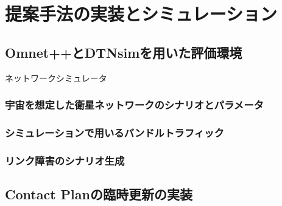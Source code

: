 \chapter{提案手法の実装とシミュレーション}
\label{chap:implementation_and_experimentation}

\section{Omnet++とDTNsimを用いた評価環境}
ネットワークシミュレータ
\subsection{宇宙を想定した衛星ネットワークのシナリオとパラメータ}
\subsection{シミュレーションで用いるバンドルトラフィック}

\subsection{リンク障害のシナリオ生成}
\section{Contact Planの臨時更新の実装}